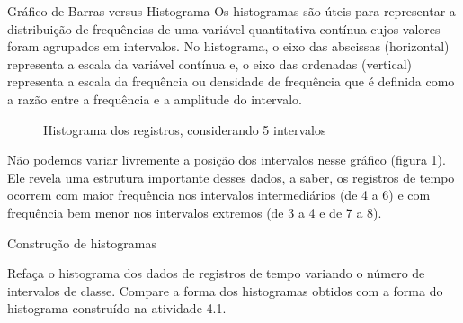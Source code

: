 {{\begin{observation}{Gráfico de Barras versus Histograma}
Os histogramas são úteis para representar a distribuição de frequências de uma variável quantitativa contínua cujos valores foram agrupados em intervalos. No histograma, o eixo das abscissas (horizontal) representa a escala da variável contínua e, o eixo das ordenadas (vertical) representa a escala da frequência ou densidade de frequência que é definida como a razão entre a frequência e a amplitude do intervalo.

\begin{figure}[H]
\centering
\capstart

\noindent

\caption{Histograma dos registros, considerando 5 intervalos}
\label{est1-fig-21}
\end{figure}

Não podemos variar livremente a posição dos intervalos nesse gráfico (\hyperref[est1-fig-21]{figura \ref{est1-fig-21}}). Ele revela uma estrutura importante desses dados, a saber, os registros de tempo ocorrem com maior frequência nos intervalos intermediários (de 4 a 6) e com frequência bem menor nos intervalos extremos (de 3 a 4 e de 7 a 8).
\end{observation}


\practice{ }
\label{est1-prac-2}

\label{est1-ativ-11}
\begin{task}{ Construção de histogramas}

Refaça o histograma dos dados de registros de tempo variando o número de intervalos de classe. Compare a forma dos histogramas obtidos com a forma do histograma construído na atividade 4.1.
\end{task}


}}
